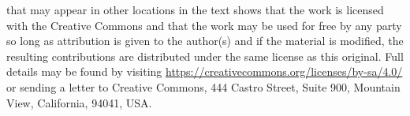 \documentclass[oneside,10pt,]{book}
\numberwithin{equation}{section}
\begin{document}
 that may appear in other locations in the text shows that the work is licensed with the Creative Commons and that the work may be used for free by any party so long as attribution is given to the author(s) and if the material is modified, the resulting contributions are distributed under the same license as this original. Full details may be found by visiting \href{https://creativecommons.org/licenses/by-sa/4.0/}{https:\slash{}\slash{}creativecommons.org\slash{}licenses\slash{}by-sa\slash{}4.0\slash{}}  or sending a letter to Creative Commons, 444 Castro Street, Suite 900, Mountain View, California, 94041, USA.\par\medskip
{}
\null\clearpage
%
%
\typeout{************************************************}
\typeout{************************************************}
%
\end{document}

